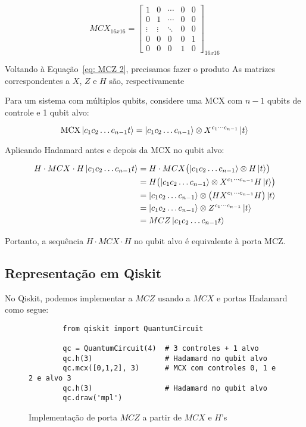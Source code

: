 \begin{equation}
    MCX_{16x16} =
    \begin{bmatrix}
        1 & 0 & \cdots & 0 & 0 \\
        0 & 1 & \cdots & 0 & 0 \\
        \vdots & \vdots & \ddots & 0 & 0 \\
        0 & 0 & 0 & 0 & 1 \\
        0 & 0 & 0 & 1 & 0 
    \end{bmatrix}
    _{16x16}
\end{equation}

Voltando à Equação~\ref{eq: MCZ 2}, precisamos fazer o produto
As matrizes correspondentes a $X$, $Z$ e $H$ são, respectivamente

Para um sistema com múltiplos qubits, considere uma MCX com \(n-1\) qubits de controle e 1 qubit alvo:

\begin{equation}
    \text{MCX}\ket{c_1 c_2 \dots c_{n-1} t} = \ket{c_1 c_2 \dots c_{n-1}} \otimes X^{c_1 \cdots c_{n-1}}\ket{t}
\end{equation}

Aplicando Hadamard antes e depois da MCX no qubit alvo:

\begin{align*}
    H \cdot MCX \cdot H \ket{c_1 c_2 \dots c_{n-1} t} 
    &= H \cdot MCX \bigl( \ket{c_1 c_2 \dots c_{n-1}} \otimes H\ket{t} \bigr) \\
    &= H \bigl( \ket{c_1 c_2 \dots c_{n-1}} \otimes X^{c_1 \cdots c_{n-1}} H\ket{t} \bigr) \\
    &= \ket{c_1 c_2 \dots c_{n-1}} \otimes \bigl( H X^{c_1 \cdots c_{n-1}} H \bigr) \ket{t} \\
    &= \ket{c_1 c_2 \dots c_{n-1}} \otimes Z^{c_1 \cdots c_{n-1}} \ket{t} \\
    &= MCZ \ket{c_1 c_2 \dots c_{n-1} t}
\end{align*}

Portanto, a sequência \(H \cdot MCX \cdot H\) no qubit alvo é equivalente à porta MCZ.

\subsection*{Representação em Qiskit}

No Qiskit, podemos implementar a $MCZ$ usando a $MCX$ e portas Hadamard como segue:
\begin{figure}
    \centering
    \caption{Implementação de porta $MCZ$ a partir de $MCX$ e $H$'s}
    \label{cod:apendiceC}
    \begin{verbatim}
        from qiskit import QuantumCircuit
        
        qc = QuantumCircuit(4)  # 3 controles + 1 alvo
        qc.h(3)                 # Hadamard no qubit alvo
        qc.mcx([0,1,2], 3)      # MCX com controles 0, 1 e 2 e alvo 3
        qc.h(3)                 # Hadamard no qubit alvo
        qc.draw('mpl')
    \end{verbatim}
\end{figure}
